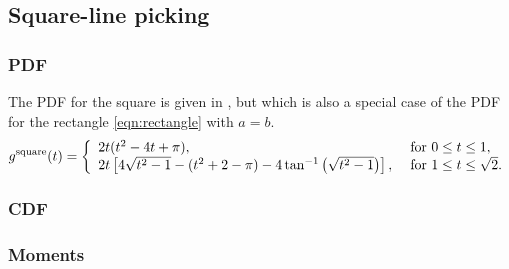 \subsection{Square-line picking}
\label{sec:square_line}


\subsubsection{PDF}

The PDF for the square is given in
\cite{philip:_probab_distr_distan_between_two,weisstein:_squar_line_picking},
but which is also a special case of the PDF for the rectangle
\eqref{eqn:rectangle} with $a=b$.
\begin{equation}
  \label{eq:square_line}
  g^{\rm square}(t) = \left\{ \begin{array}{ll}
      2t (t^2-4t+\pi), & \mbox{ for } 0 \leq t \leq 1, \\
      2t \left[4 \sqrt{t^2-1} - (t^2+2-\pi) - 4 \tan^{-1} \left(\sqrt{t^2-1} \right)\right], 
               & \mbox{ for } 1 \leq t \leq \sqrt{2} . \\ 
    \end{array} \right.
\end{equation}

\subsubsection{CDF}


\subsubsection{Moments}


